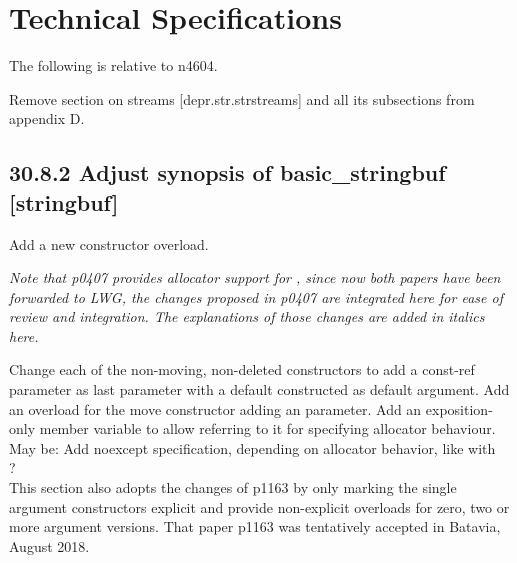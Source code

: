 \documentclass[ebook,11pt,article]{memoir}
\begin{document}
\chapter{Technical Specifications}
The following is relative to n4604.

Remove section on  streams [depr.str.strstreams] and all its subsections from appendix D.

\section{30.8.2 Adjust synopsis of basic\_stringbuf [stringbuf]}
Add a new constructor overload.

\textit{Note that p0407 provides allocator support for , since now both papers have been forwarded to LWG, the changes proposed in p0407 are integrated here for ease of review and integration. The explanations of those changes are added in italics here.}

\begin{em}
Change each of the non-moving, non-deleted constructors to add a const-ref  parameter as last parameter with a default constructed  as default argument. Add an overload for the move constructor adding an  parameter. Add an exposition-only member variable  to allow referring to it for specifying allocator behaviour. May be: Add noexcept specification, depending on allocator behavior, like with ?\
\\
This section also adopts the changes of p1163 by only marking the single argument constructors explicit and provide non-explicit overloads for zero, two or more argument versions. That paper p1163 was tentatively accepted in Batavia, August 2018.
\end{em}
\end{document}
